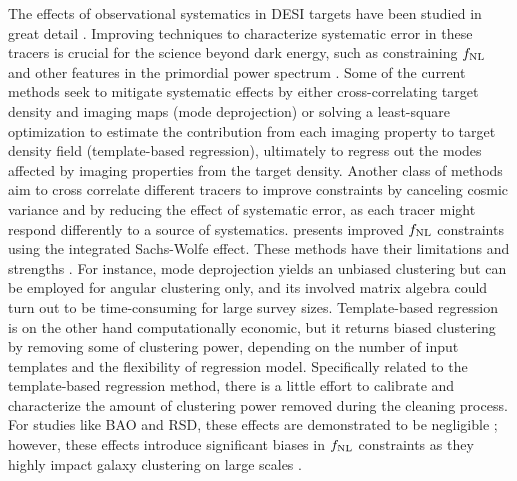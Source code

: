 The effects of observational systematics in DESI targets have been studied in great detail \cite[see, e.g.,][]{kitanidis2020imaging, zhou2021clustering, chaussidon2022angular}. Improving techniques to characterize systematic error in these tracers is crucial for the science beyond dark energy, such as constraining $f_{\rm NL}$ and other features in the primordial power spectrum \citep{beutler2019primordial}. Some of the current methods seek to mitigate systematic effects by either cross-correlating target density and imaging maps (mode deprojection) or solving a least-square optimization to estimate the contribution from each imaging property to target density field (template-based regression), ultimately to regress out the modes affected by imaging properties from the target density. Another class of methods aim to cross correlate different tracers to improve constraints by canceling cosmic variance and by reducing the effect of systematic error, as each tracer might respond differently to a source of systematics. \cite{giannantonio2014improved} presents improved $f_{\rm NL}$ constraints using the integrated Sachs-Wolfe effect. These methods have their limitations and strengths \citep[see, e.g.,][for a review]{2021MNRAS.503.5061W}. For instance, mode deprojection yields an unbiased clustering but can be employed for angular clustering only, and its involved matrix algebra could turn out to be time-consuming for large survey sizes. Template-based regression is on the other hand computationally economic, but it returns biased clustering by removing some of clustering power, depending on the number of input templates and the flexibility of regression model. Specifically related to the template-based regression method, there is a little effort to calibrate and characterize the amount of clustering power removed during the cleaning process. For studies like BAO and RSD, these effects are demonstrated to be negligible \citep{merz2021clustering}; however, these effects introduce significant biases in $f_{\rm NL}$ constraints \citep{mueller2022primordial} as they highly impact galaxy clustering on large scales \citep{rezaie2021primordial}.  
 
